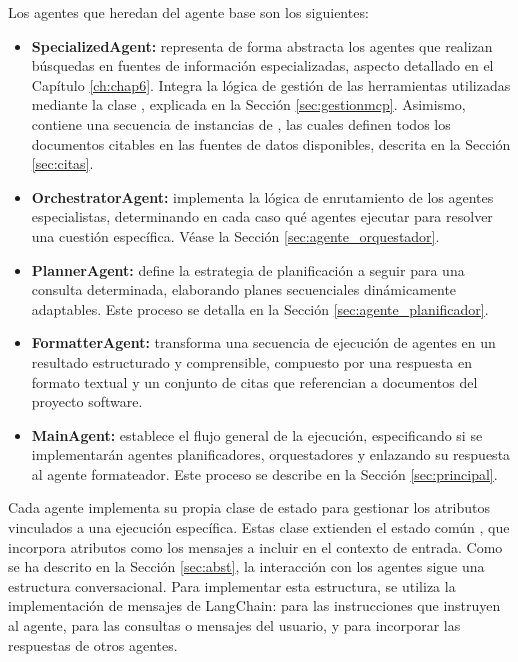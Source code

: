 Los agentes que heredan del agente base son los siguientes:
\begin{itemize}
  \item \textbf{SpecializedAgent:} representa de forma abstracta los agentes que realizan búsquedas en fuentes de información especializadas, aspecto detallado en el Capítulo \ref{ch:chap6}. Integra la lógica de gestión de las herramientas utilizadas mediante la clase , explicada en la Sección \ref{sec:gestionmcp}. Asimismo, contiene una secuencia de instancias de , las cuales definen todos los documentos citables en las fuentes de datos disponibles, descrita en la Sección \ref{sec:citas}.
  \item \textbf{OrchestratorAgent:} implementa la lógica de enrutamiento de los agentes especialistas, determinando en cada caso qué agentes ejecutar para resolver una cuestión específica. Véase la Sección \ref{sec:agente_orquestador}.
  \item \textbf{PlannerAgent:} define la estrategia de planificación a seguir para una consulta determinada, elaborando planes secuenciales dinámicamente adaptables. Este proceso se detalla en la Sección \ref{sec:agente_planificador}.
  \item \textbf{FormatterAgent:} transforma una secuencia de ejecución de agentes en un resultado estructurado y comprensible, compuesto por una respuesta en formato textual y un conjunto de citas que referencian a documentos del proyecto software. 
  \item \textbf{MainAgent:} establece el flujo general de la ejecución, especificando si se implementarán agentes planificadores, orquestadores y enlazando su respuesta al agente formateador. Este proceso se describe en la Sección \ref{sec:principal}.
\end{itemize}

Cada agente implementa su propia clase de estado para gestionar los atributos vinculados a una ejecución específica. Estas clase extienden el estado común , que incorpora atributos como los mensajes a incluir en el contexto de entrada. Como se ha descrito en la Sección \ref{sec:abst}, la interacción con los agentes sigue una estructura conversacional. Para implementar esta estructura, se utiliza la implementación de mensajes de LangChain:  para las instrucciones que instruyen al agente,  para las consultas o mensajes del usuario, y  para incorporar las respuestas de otros agentes.

